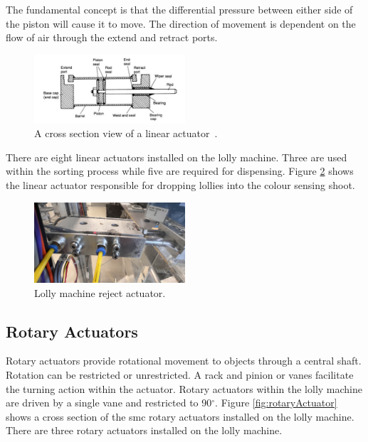     The fundamental concept is that the differential pressure between either side of the piston will cause it to move\cite{parr2011hydraulics}. The direction of movement is dependent on the flow of air through the extend and retract ports.
    
    \begin{figure}[H] 
        \centering
        \includegraphics[width = 0.5\textwidth]{2_images/linearActuator.png}
        \caption{A cross section view of a linear actuator~\cite{parr2011hydraulics}.}
        \label{fig:linearActuator}
    \end{figure}
    
    There are eight linear actuators installed on the lolly machine. Three are used within the sorting process while five are required for dispensing. Figure \ref{fig:rejectAct} shows the linear actuator responsible for dropping lollies into the colour sensing shoot.

    \begin{figure}[H] 
        \centering
        \includegraphics[width = 0.5\textwidth]{2_images/rejectAct.png}
        \caption{Lolly machine reject actuator.}
        \label{fig:rejectAct}
    \end{figure}        
\newpage     
\subsection{Rotary Actuators}
    Rotary actuators provide rotational movement to objects through a central shaft\cite{parr2011hydraulics}. Rotation can be restricted or unrestricted. A rack and pinion or vanes facilitate the turning action within the actuator\cite{parr2011hydraulics}. Rotary actuators within the lolly machine are driven by a single vane and restricted to 90$^{\circ}$\cite{smcRot}. Figure \ref{fig:rotaryActuator} shows a cross section of the \acrshort{smc} rotary actuators installed on the lolly machine. There are three rotary actuators installed on the lolly machine.
    
